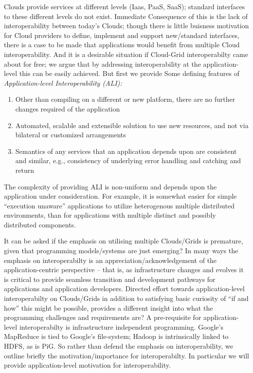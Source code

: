 \documentclass[conference,final]{IEEEtran}
\begin{document}
Clouds provide services at different levels (Iaas, PaaS, SaaS);
standard interfaces to these different levels do not exist. Immediate
Consequence of this is the lack of interoperability between today's
Clouds; though there is little buisness motivation for Cloud providers
to define, implement and support new/standard interfaces, there is a
case to be made that applications would benefit from multiple Cloud
interoperability.  And it is a desirable situation if Cloud-Grid
interoperabilty came about for free; we argue that by addressing
interoperability at the application-level this can be easily achieved.
But first we provide Some defining features of {\it Application-level
  Interoperability (ALI):}
\begin{enumerate}
\item Other than compiling on a different or new platform, there are no
  further changes required of the application
\item Automated, scalable and extensible solution to use new resources,
  and not via  bilateral or customized arrangements
\item Semantics of any services that an application depends upon are
  consistent and similar, e.g., consistency of underlying error
  handling and catching and return
\end{enumerate}

The complexity of providing ALI is non-uniform and depends upon the
application under consideration. For example, it is somewhat easier
for simple ``execution unaware'' applications to utilize heterogenous
multiple distributed environments, than for applications with multiple
distinct and possibly distributed components.


It can be asked if the emphasis on utilising multiple Clouds/Grids is
premature, given that programming models/systems are just emerging? In
many ways the emphasis on interoperabilty is an
appreciation/acknowledgement of the application-centric perspective --
that is, as infrastructure changes and evolves it is critical to
provide seamless transition and development pathways for applications
and application developers. Directed effort towards application-level
interoperabilty on Clouds/Grids in addition to satisfying basic
curiosity of ``if and how'' this might be possible, provides a
different insight into what the programming challenges and
requirements are?  A pre-requisite for application-level
interoperabilty is infrastructure independent programming. Google's
MapReduce is tied to Google's file-system; Hadoop is intrinsically
linked to HDFS, as is PiG.  So rather than defend the emphasis on
interoperability, we outline briefly the motivation/importance for
interoperabilty. In particular we will provide application-level
motivation for interoperability.
\end{document}
